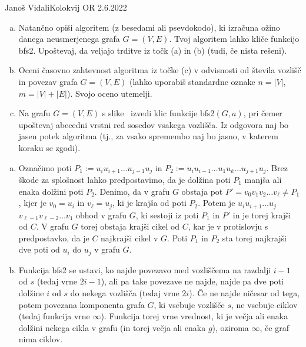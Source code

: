 \begin{naloga}{Janoš Vidali}{Kolokvij OR 2.6.2022}
\begin{vprasanje}
\begin{enumerate}[(a)]
\item Natančno opiši algoritem (z besedami ali psevdokodo),
ki izračuna ožino danega neusmerjenega grafa $G = (V, E)$.
Tvoj algoritem lahko kliče funkcijo {\sc bfs2}.
Upoštevaj, da veljajo trditve iz točk (a) in (b)
(tudi, če nista rešeni).

\item Oceni časovno zahtevnost algoritma iz točke (c)
v odvisnosti od števila vozlišč in povezav grafa $G = (V, E)$
(lahko uporabiš standardne oznake $n = |V|$, $m = |V| + |E|$).
Svojo oceno utemelji.

\item Na grafu $G = (V, E)$ s slike~\fig
izvedi klic funkcije {\sc bfs2}$(G, a)$,
pri čemer upoštevaj abecedni vrstni red sosedov vsakega vozlišča.
Iz odgovora naj bo jasen potek algoritma
(tj., za vsako spremembo naj bo jasno, v katerem koraku se zgodi).
\end{enumerate}

\begin{slika}
\pgfslika
{}
\end{slika}
\end{vprasanje}

\begin{odgovor}
\begin{enumerate}[(a)]
\item Označimo poti $P_1 := u_i u_{i+1} \dots u_{j-1} u_j$
in $P_2 := u_i u_{i-1} \dots u_1 u_k \dots u_{j+1} u_j$.
Brez škode za splošnost lahko predpostavimo, da je dolžina poti $P_1$
manjša ali enaka dolžini poti $P_2$.
Denimo, da v grafu $G$ obstaja pot $P' = v_0 v_1 v_2 \dots v_\ell \ne P_1$,
kjer je $v_0 = u_i$ in $v_\ell = u_j$, ki je krajša od poti $P_2$.
Potem je $u_i u_{i+1} \dots u_j$ $v_{\ell-1} v_{\ell-2} \dots v_1$
obhod v grafu $G$,
ki sestoji iz poti $P_1$ in $P'$ in je torej krajši od $C$.
V grafu $G$ torej obstaja krajši cikel od $C$,
kar je v protislovju s predpostavko, da je $C$ najkrajši cikel v $G$.
Poti $P_1$ in $P_2$ sta torej najkrajši dve poti od $u_i$ do $u_j$ v grafu $G$.

\item Funkcija {\sc bfs2} se ustavi,
ko najde povezavo med vozliščema na razdalji $i-1$ od $s$ (tedaj vrne $2i-1$),
ali pa take povezave ne najde,
najde pa dve poti dolžine $i$ od $s$ do nekega vozlišča (tedaj vrne $2i$).
Če ne najde ničesar od tega,
potem povezana komponenta grafa $G$, ki vsebuje vozlišče $s$,
ne vsebuje ciklov (tedaj funkcija vrne $\infty$).
Funkcija torej vrne vrednost,
ki je večja ali enaka dolžini nekega cikla v grafu
(in torej večja ali enaka $g$),
oziroma $\infty$, če graf nima ciklov.


\end{enumerate}
\end{odgovor}
\end{naloga}
